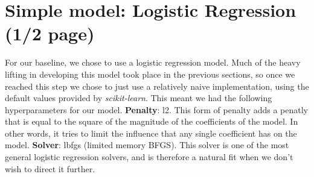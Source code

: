 \section{Simple model: Logistic Regression (1/2 page)} 
For our baseline, we chose to use a logistic regression model. Much of the heavy lifting in developing this model took place in the previous sections,
so once we reached this step we chose to just use a relatively naive implementation, using the default values provided
by \textit{scikit-learn}. This meant we had the following hyperparameters for our model. \textbf{Penalty}: l2. This form of penalty adds a penatly that is equal to the square of the magnitude of the
    coefficients of the model. In other words, it tries to limit the influence that any single coefficient has on the
    model. \textbf{Solver}: lbfgs (limited memory BFGS). This solver is one of the most general logistic regression
    solvers, and is therefore a natural fit when we don't wish to direct it further.

